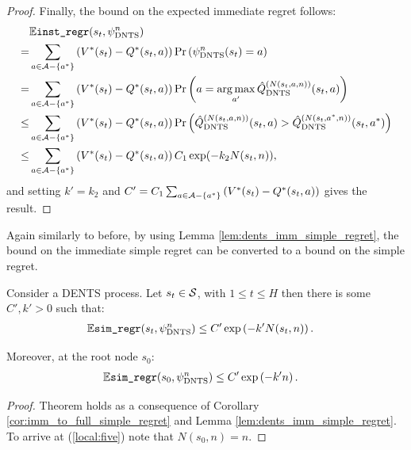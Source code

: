 \begin{proof}
            Finally, the bound on the expected immediate regret follows:
            \begin{align}
                & \mathbb{E}{\textnormal{\texttt{inst\_regr}}}(s_t,{\psi^{n}_{{\textnormal{DNTS}}}})  \\
                    =& \sum_{a\in\mathcal{A}-\{a^*\}} 
                        \left(V^*(s_t)-Q^*(s_t,a)\right) \Pr\left({\psi^{n}_{{\textnormal{DNTS}}}}(s_t) =a \right) \\
                    =& \sum_{a\in\mathcal{A}-\{a^*\}} 
                        \left(V^*(s_t)-Q^*(s_t,a)\right) \Pr\left(a = \operatorname*{arg\,max}_{a'} {\hat{Q}^{(N(s_t,a,n))}_{{\textnormal{DNTS}}}}(s_t,a) \right) \\
                    \leq& \sum_{a\in\mathcal{A}-\{a^*\}} 
                        \left(V^*(s_t)-Q^*(s_t,a)\right) 
                        \Pr\left({\hat{Q}^{(N(s_t,a,n))}_{{\textnormal{DNTS}}}}(s_t,a) > {\hat{Q}^{(N(s_t,a^*,n))}_{{\textnormal{DNTS}}}}(s_t,a^*)  \right) \\
                    \leq&  \sum_{a\in\mathcal{A}-\{a^*\}} 
                        \left(V^*(s_t)-Q^*(s_t,a)\right) C_1 \exp(-k_2N(s_t,n)),
            \end{align}
            and setting $k'=k_2$ and $C'=C_1\sum_{a\in\mathcal{A}-\{a^*\}} \left(V^*(s_t)-Q^*(s_t,a)\right)$ gives the result.
        \end{proof}












        Again similarly to before, by using Lemma \ref{lem:dents_imm_simple_regret}, the bound on the immediate simple regret can be converted to a bound on the simple regret.
            
        \begin{theorem} \label{thrm:dents_simple_regret_converge}
            Consider a DENTS process. Let $s_t\in\mathcal{S}$, with $1\leq t \leq H$  then there is some $C',k'>0$ such that:
            \begin{align}
                \mathbb{E} {\textnormal{\texttt{sim\_regr}}}(s_{t},{\psi^{n}_{{\textnormal{DNTS}}}}) &\leq C'\exp\left( -k' N(s_{t},n) \right).
            \end{align}
            
            Moreover, at the root node $s_0$:
            \begin{align}
                \mathbb{E} {\textnormal{\texttt{sim\_regr}}}(s_{0},{\psi^{n}_{{\textnormal{DNTS}}}}) &\leq C'\exp\left( -k'n \right). \label{local:five}
            \end{align}
        \end{theorem}
        \begin{proof}
            Theorem holds as a consequence of Corollary \ref{cor:imm_to_full_simple_regret} and Lemma \ref{lem:dents_imm_simple_regret}. To arrive at (\ref{local:five}) note that $N(s_0,n)=n$.
        \end{proof}














